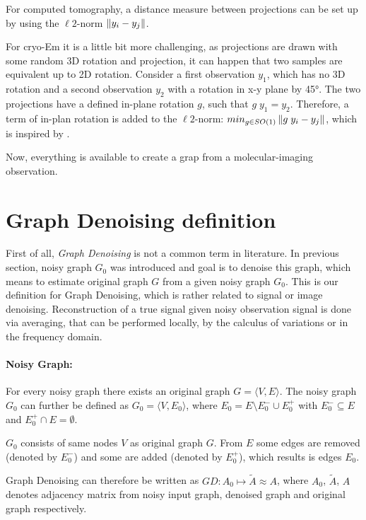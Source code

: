 For computed tomography, a distance measure between projections can be set up by using the $\ell2$-norm $\left\lVert y_i - y_j\right\rVert$.

For cryo-Em it is a little bit more challenging, as projections are drawn with some random 3D rotation and projection, 
it can happen that two samples are equivalent up to 2D rotation. 
Consider a first observation $y_1$, which has no 3D rotation and 
a second observation $y_2$ with a rotation in x-y plane by 45°.
The two projections have a defined in-plane rotation $g$, such that $g \; y_1 = y_2$.
Therefore, a term of in-plan rotation is added to the $\ell2$-norm: $min_{g \in SO(1)}\left\lVert g \;y_i - y_j\right\rVert$, 
which is inspired by \cite{multiDiffusionMaps}. 

Now, everything is available to create a grap from a molecular-imaging observation.


\section{Graph Denoising definition}

First of all, \textit{Graph Denoising} is not a common term in literature.
In previous section, noisy graph $G_0$ was introduced and goal is to denoise this graph,
which means to estimate original graph $G$ from a given noisy graph $G_0$. 
This is our definition for Graph Denoising, which is rather related to signal or image denoising.
Reconstruction of a true signal given noisy observation signal is done via averaging, that can be performed
locally, by the calculus of variations or in the frequency domain\cite{noneLocalMean}. 

\paragraph{Noisy Graph:}
For every noisy graph there exists an original graph $G = \langle V,E \rangle$.
The noisy graph $G_0$ can further be defined as $G_0 = \langle V, E_0 \rangle$,  
 where $E_0 = E \setminus  E^{-}_0 \cup  E^{+}_0$ with $E^{-}_0 \subseteq E$ and $E^{+}_0 \cap E = \emptyset$.

$G_0$ consists of same nodes $V$ as original graph $G$. 
From $E$ some edges are removed (denoted by $E^{-}_0$) and some are added
(denoted by $E^{+}_0$), which results is edges $E_0$.

Graph Denoising can therefore be written as $GD: A_0 \mapsto \tilde{A} \approx A$,
where $A_0$, $\tilde{A}$, $A$ denotes adjacency matrix from noisy input graph, denoised graph and original graph respectively.


